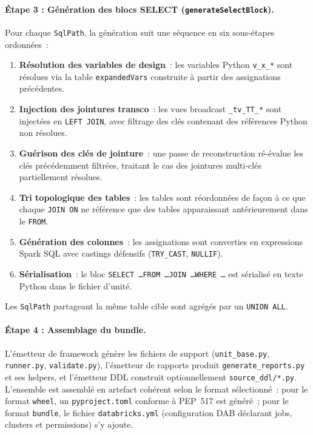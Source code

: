 \paragraph{Étape 3 : Génération des blocs SELECT (\texttt{generateSelectBlock}).}
Pour chaque \texttt{SqlPath}, la génération suit une séquence en six sous-étapes ordonnées~:
\begin{enumerate}[leftmargin=*, label=\textbf{\arabic*.}]
  \item \textbf{Résolution des variables de design}~: les variables Python \texttt{v\_x\_*} sont résolues via la table \texttt{expandedVars} construite à partir des assignations précédentes.
  \item \textbf{Injection des jointures transco}~: les vues broadcast \texttt{\_tv\_TT\_*} sont injectées en \texttt{LEFT JOIN}, avec filtrage des clés contenant des références Python non résolues.
  \item \textbf{Guérison des clés de jointure}~: une passe de reconstruction ré-évalue les clés précédemment filtrées, traitant le cas des jointures multi-clés partiellement résolues.
  \item \textbf{Tri topologique des tables}~: les tables sont réordonnées de façon à ce que chaque \texttt{JOIN ON} ne référence que des tables apparaissant antérieurement dans le \texttt{FROM}.
  \item \textbf{Génération des colonnes}~: les assignations sont converties en expressions Spark SQL avec castings défensifs (\texttt{TRY\_CAST}, \texttt{NULLIF}).
  \item \textbf{Sérialisation}~: le bloc \texttt{SELECT \ldots FROM \ldots JOIN \ldots WHERE \ldots} est sérialisé en texte Python dans le fichier d'unité.
\end{enumerate}
Les \texttt{SqlPath} partageant la même table cible sont agrégés par un \texttt{UNION ALL}.

\paragraph{Étape 4 : Assemblage du bundle.}
L'émetteur de framework génère les fichiers de support (\texttt{unit\_base.py}, \texttt{runner.py}, \texttt{validate.py}), l'émetteur de rapports produit \texttt{generate\_reports.py} et ses helpers, et l'émetteur DDL construit optionnellement \texttt{source\_ddl/*.py}. L'ensemble est assemblé en artefact cohérent selon le format sélectionné~: pour le format \texttt{wheel}, un \texttt{pyproject.toml} conforme à PEP~517 est généré~; pour le format \texttt{bundle}, le fichier \texttt{databricks.yml} (configuration DAB déclarant jobs, clusters et permissions) s'y ajoute.


